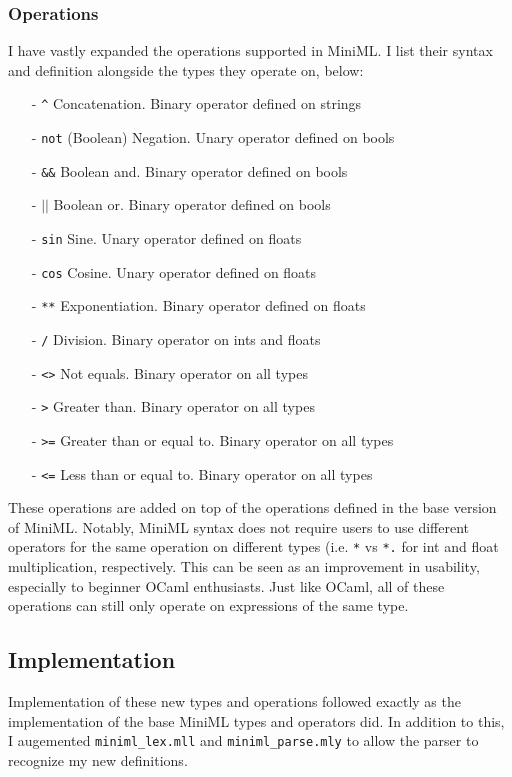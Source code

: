 \documentclass[10pt,letterpaper]{article}
\begin{document}
\subsubsection*{Operations}
I have vastly expanded the operations supported in MiniML. I list their syntax and definition alongside the types they operate on, below:
\begin{itemize}
    \item[-] \verb|^| Concatenation. Binary operator defined on strings
    \item[-] \verb|not| (Boolean) Negation. Unary operator defined on bools
    \item[-] \verb|&&| Boolean and. Binary operator defined on bools
    \item[-] $||$  Boolean or. Binary operator defined on bools
    \item[-] \verb|sin| Sine. Unary operator defined on floats
    \item[-] \verb|cos| Cosine. Unary operator defined on floats
    \item[-] \verb|**| Exponentiation. Binary operator defined on floats
    \item[-] \verb|/| Division. Binary operator on ints and floats
    \item[-] \verb|<>| Not equals. Binary operator on all types
    \item[-] \verb|>| Greater than. Binary operator on all types
    \item[-] \verb|>=| Greater than or equal to. Binary operator on all types 
    \item[-] \verb|<=| Less than or equal to. Binary operator on all types 
\end{itemize}
These operations are added on top of the operations defined in the base version of MiniML. Notably, MiniML syntax does not require users to use different operators for the same operation on different types (i.e. \verb|*| vs \verb|*.| for int and float multiplication, respectively. This can be seen as an improvement in usability, especially to beginner OCaml enthusiasts. Just like OCaml, all of these operations can still only operate on expressions of the same type. 

\subsection*{Implementation}
Implementation of these new types and operations followed exactly as the implementation of the base MiniML types and operators did. In addition to this, I augemented \verb|miniml_lex.mll| and \verb|miniml_parse.mly| to allow the parser to recognize my new definitions.
\end{document}
